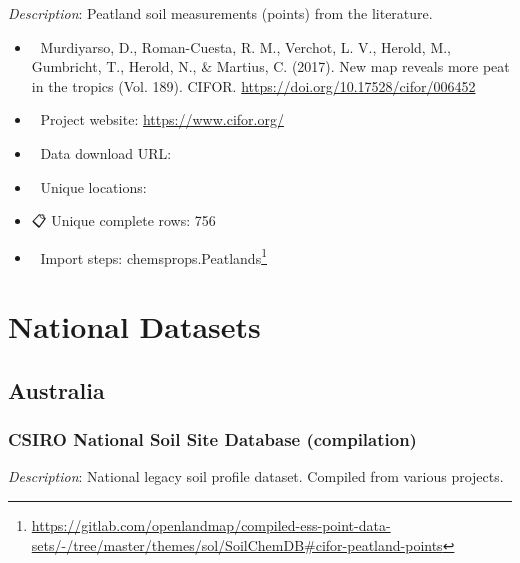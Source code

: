\documentclass[
  graybox,natbib,nospthms]{svmono}
\providecommand{\tightlist}{%
  \setlength{\itemsep}{0pt}\setlength{\parskip}{0pt}}
\providecommand{\tightlist}{\setlength{\itemsep}{0pt}\setlength{\parskip}{0pt}}
\renewcommand{\href}[2]{#2 (\url{#1})}
\renewcommand{\href}[2]{#2\footnote{\url{#1}}}
\begin{document}
\emph{Description}: Peatland soil measurements (points) from the literature.

\begin{itemize}
\tightlist
\item
  📕 Murdiyarso, D., Roman-Cuesta, R. M., Verchot, L. V., Herold, M., Gumbricht, T., Herold, N., \& Martius, C. (2017). New map reveals more peat in the tropics (Vol. 189). CIFOR. \url{https://doi.org/10.17528/cifor/006452}\\
\item
  🔗 Project website: \url{https://www.cifor.org/}\\
\item
  📂 Data download URL:\\
\item
  📍 Unique locations:\\
\item
  📋 Unique complete rows: 756\\
\item
  📝 Import steps: \href{https://gitlab.com/openlandmap/compiled-ess-point-data-sets/-/tree/master/themes/sol/SoilChemDB\#cifor-peatland-points}{chemsprops.Peatlands}
\end{itemize}

\hypertarget{national-datasets}{%
\section{National Datasets}\label{national-datasets}}

\hypertarget{australia}{%
\subsection{Australia}\label{australia}}

\hypertarget{csiro-national-soil-site-database-compilation}{%
\subsubsection{CSIRO National Soil Site Database (compilation)}\label{csiro-national-soil-site-database-compilation}}

\emph{Description}: National legacy soil profile dataset. Compiled from various projects.
\end{document}
